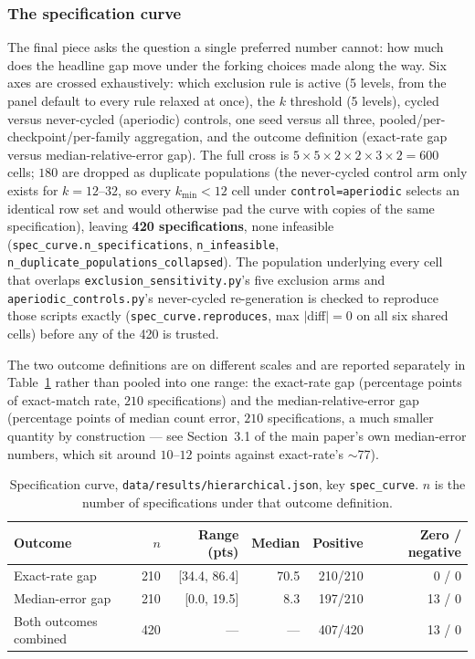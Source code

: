 \documentclass[11pt]{article}
\begin{document}
\subsubsection{The specification curve}

The final piece asks the question a single preferred number cannot: how much
does the headline gap move under the forking choices made along the way. Six
axes are crossed exhaustively: which exclusion rule is active (5 levels, from
the panel default to every rule relaxed at once), the $k$ threshold (5
levels), cycled versus never-cycled (aperiodic) controls, one seed versus all
three, pooled/per-checkpoint/per-family aggregation, and the outcome
definition (exact-rate gap versus median-relative-error gap). The full cross
is $5\times5\times2\times2\times3\times2=600$ cells; $180$ are dropped as
duplicate populations (the never-cycled control arm only exists for
$k=12$--$32$, so every $k_{\min}<12$ cell under \texttt{control=aperiodic}
selects an identical row set and would otherwise pad the curve with copies of
the same specification), leaving \textbf{420 specifications}, none infeasible
(\texttt{spec\_curve.n\_specifications}, \texttt{n\_infeasible},
\texttt{n\_duplicate\_populations\_collapsed}). The population underlying every
cell that overlaps \texttt{exclusion\_sensitivity.py}'s five exclusion arms and
\texttt{aperiodic\_controls.py}'s never-cycled re-generation is checked to
reproduce those scripts exactly (\texttt{spec\_curve.reproduces}, max
$|$diff$|=0$ on all six shared cells) before any of the 420 is trusted.

The two outcome definitions are on different scales and are reported
separately in Table~\ref{tab:hier-spec} rather than pooled into one range: the
exact-rate gap (percentage points of exact-match rate, $210$ specifications)
and the median-relative-error gap (percentage points of median count error,
$210$ specifications, a much smaller quantity by construction --- see
Section~3.1 of the main paper's own median-error numbers, which sit around
$10$--$12$ points against exact-rate's $\sim$77).

\begin{table}[h]
\centering
\caption{Specification curve, \texttt{data/results/hierarchical.json}, key
\texttt{spec\_curve}. $n$ is the number of specifications under that outcome
definition.}
\label{tab:hier-spec}
\small
\begin{tabular}{@{}lrrrrr@{}}
\toprule
Outcome & $n$ & Range (pts) & Median & Positive & Zero / negative \\
\midrule
Exact-rate gap & 210 & [34.4, 86.4] & 70.5 & 210/210 & 0 / 0 \\
Median-error gap & 210 & [0.0, 19.5] & 8.3 & 197/210 & 13 / 0 \\
\midrule
Both outcomes combined & 420 & --- & --- & 407/420 & 13 / 0 \\
\bottomrule
\end{tabular}
\end{table}
\end{document}
